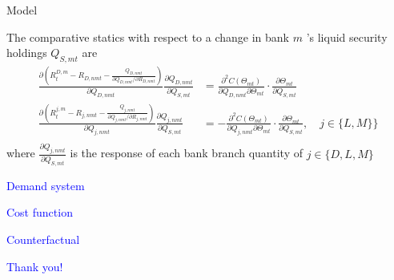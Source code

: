 \documentclass[notes,11pt, aspectratio=169]{beamer}
\begin{document}
\begin{frame}{Model}


    The comparative statics with respect to a change in bank $m$ 's liquid security holdings $Q_{S, m t}$ are
$$
\begin{aligned}
\frac{\partial\left(R_t^{D, m}-R_{D, n m t}-\frac{Q_{D, n m t}}{\partial Q_{D, n m t} / \partial R_{D, n m t}}\right)}{\partial Q_{D, n m t}} \frac{\partial Q_{D, n m t}}{\partial Q_{S, m t}} & =\frac{\partial^2 C\left(\Theta_{m t}\right)}{\partial Q_{D, n m t} \partial \Theta_{m t}} \cdot \frac{\partial \Theta_{m t}}{\partial Q_{S, m t}} \\
\frac{\partial\left(R_t^{j, m}-R_{j, n m t}-\frac{Q_{j, n m t}}{\partial Q_{j, n m t} / \partial R_{j, n m t}}\right)}{\partial Q_{j, n m t}} \frac{\partial Q_{j, n m t}}{\partial Q_{S, m t}} & =-\frac{\partial^2 C\left(\Theta_{m t}\right)}{\partial Q_{j, n m t} \partial \Theta_{m t}} \cdot \frac{\partial \Theta_{m t}}{\partial Q_{S, m t}}, \quad j \in \{ L,M\} \}  \\
\end{aligned}
$$
 where $\frac{\partial Q_{j, n m t}}{\partial Q_{S, m t}}$ is the response of each bank branch quantity of $j \in \{D,L,M \}$ %
\end{frame}


\begin{frame}
    \textcolor{blue}{\huge{\centerline{Demand system}}}
\end{frame}


\begin{frame}
    \textcolor{blue}{\huge{\centerline{Cost function}}}
\end{frame}

\begin{frame}
    \textcolor{blue}{\huge{\centerline{Counterfactual}}}
\end{frame}


\begin{frame}
\textcolor{blue}{\huge{\centerline{Thank you!}}}
\end{frame}
\end{document}
